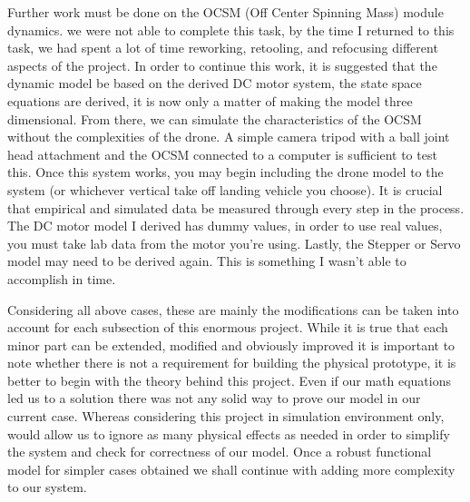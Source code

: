 Further work must be done on the OCSM (Off Center Spinning Mass) module dynamics. we were not able to complete this task, by the time I returned to this task, we had spent a lot of time reworking, retooling, and refocusing different aspects of the project. In order to continue this work, it is suggested that the dynamic model be based on the derived DC motor system, the state space equations are derived, it is now only a matter of making the model three dimensional. From there, we can simulate the characteristics of the OCSM without the complexities of the drone. A simple camera tripod with a ball joint head attachment and the OCSM connected to a computer is sufficient to test this. Once this system works, you may begin including the drone model to the system (or whichever vertical take off landing vehicle you choose). It is crucial that empirical and simulated data be measured through every step in the process. The DC motor model I derived has dummy values, in order to use real values, you must take lab data from the motor you're using. Lastly, the Stepper or Servo model may need to be derived again. This is something I wasn't able to accomplish in time.

Considering all above cases, these are mainly the modifications can be taken into account for each subsection of this enormous project. While it is true that each minor part can be extended, modified and obviously improved it is important to note whether there is not a requirement for building the physical prototype, it is better to begin with the theory behind this project. Even if our math equations led us to a solution there was not any solid way to prove our model in our current case. Whereas considering this project in simulation environment only, would allow us to ignore as many physical effects as needed in order to simplify the system and check for  correctness of our model. Once a robust functional model for simpler cases obtained we shall continue with adding more complexity to our system.   

